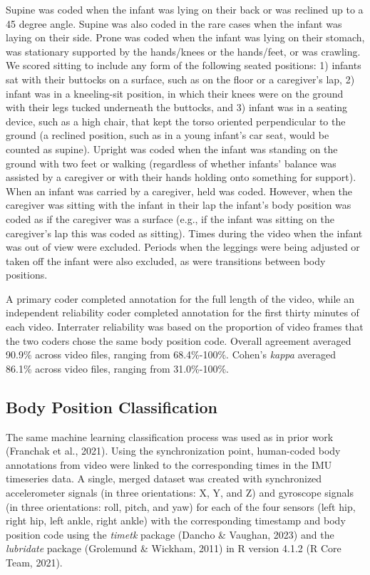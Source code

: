 \documentclass[
  man]{apa6}
\begin{document}
Supine was coded when the infant was lying on their back or was reclined up to a 45 degree angle. Supine was also coded in the rare cases when the infant was laying on their side. Prone was coded when the infant was lying on their stomach, was stationary supported by the hands/knees or the hands/feet, or was crawling. We scored sitting to include any form of the following seated positions: 1) infants sat with their buttocks on a surface, such as on the floor or a caregiver's lap, 2) infant was in a kneeling-sit position, in which their knees were on the ground with their legs tucked underneath the buttocks, and 3) infant was in a seating device, such as a high chair, that kept the torso oriented perpendicular to the ground (a reclined position, such as in a young infant's car seat, would be counted as supine). Upright was coded when the infant was standing on the ground with two feet or walking (regardless of whether infants' balance was assisted by a caregiver or with their hands holding onto something for support). When an infant was carried by a caregiver, held was coded. However, when the caregiver was sitting with the infant in their lap the infant's body position was coded as if the caregiver was a surface (e.g., if the infant was sitting on the caregiver's lap this was coded as sitting). Times during the video when the infant was out of view were excluded. Periods when the leggings were being adjusted or taken off the infant were also excluded, as were transitions between body positions.

A primary coder completed annotation for the full length of the video, while an independent reliability coder completed annotation for the first thirty minutes of each video. Interrater reliability was based on the proportion of video frames that the two coders chose the same body position code. Overall agreement averaged 90.9\% across video files, ranging from 68.4\%-100\%. Cohen's \emph{kappa} averaged 86.1\% across video files, ranging from 31.0\%-100\%.

\hypertarget{body-position-classification}{%
\subsection{Body Position Classification}\label{body-position-classification}}

The same machine learning classification process was used as in prior work (Franchak et al., 2021). Using the synchronization point, human-coded body annotations from video were linked to the corresponding times in the IMU timeseries data. A single, merged dataset was created with synchronized accelerometer signals (in three orientations: X, Y, and Z) and gyroscope signals (in three orientations: roll, pitch, and yaw) for each of the four sensors (left hip, right hip, left ankle, right ankle) with the corresponding timestamp and body position code using the \emph{timetk} package (Dancho \& Vaughan, 2023) and the \emph{lubridate} package (Grolemund \& Wickham, 2011) in R version 4.1.2 (R Core Team, 2021).
\end{document}
